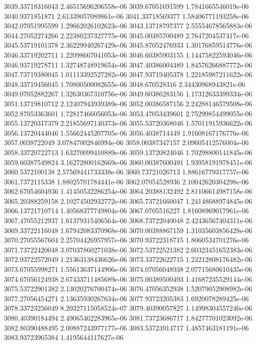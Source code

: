 {3039.33718316043 2.46515696206558e-06
3039.67051691599 1.7841665546019e-06
3040.9371851871 2.61339057089861e-06
3041.33718569377 1.58406771193258e-06
3042.07051995599 1.29662026102623e-06
3043.13718797377 2.55554678565883e-06
3044.27052274266 2.22380237327775e-06
3045.00385700489 2.7647204537417e-06
3045.53719101378 2.36229940267429e-06
3045.87052476933 1.30176859514776e-06
3046.33719202711 1.22098667041053e-06
3046.60385903155 1.14475822593046e-06
3046.93719278711 1.32748748919654e-06
3047.40386004489 1.84576266887772e-06
3047.73719380045 1.01113392527282e-06
3047.93719405378 1.22185987211622e-06
3048.33719456045 1.70800500082655e-06
3048.670528316 2.34430968943821e-06
3049.07052882267 1.32630367310756e-06
3049.60386283156 1.17312633399334e-06
3051.13719810712 2.12407943939389e-06
3052.00386587156 2.24288146579508e-06
3052.87053363601 1.72817466056053e-06
3053.47053439601 2.75299854499055e-06
3055.13720317379 2.21855697140373e-06
3055.53720368046 1.57011915936622e-06
3056.13720444046 1.55662445207705e-06
3056.4038714449 1.91608167176776e-06
3057.0038722049 3.07847002846994e-06
3058.00387347157 2.09605412576004e-06
3058.33720722713 1.63270099410889e-06
3059.13720824046 1.70298800141845e-06
3059.60387549824 3.16272800162669e-06
3060.00387600491 1.93958191978451e-06
3060.5372100138 2.57569441733338e-06
3060.73721026713 1.88616779317757e-06
3061.7372115338 1.88025701784441e-06
3062.07054528936 2.10042620304298e-06
3062.67054604936 1.41450532286254e-06
3064.20388132492 2.81106614987158e-06
3065.20388259158 2.10274502932772e-06
3065.73721660047 1.24148688974845e-06
3066.13721710714 1.40568377749804e-06
3067.0705516227 1.81608969017961e-06
3067.47055212937 1.61379315406564e-06
3068.73722040048 2.42436567404311e-06
3069.33722116048 1.67942083370968e-06
3070.00388867159 1.31035603856428e-06
3070.27055567604 2.25704426957957e-06
3070.93722318715 1.8060534701276e-06
3071.73722420048 3.07037860271038e-06
3072.53722521382 2.60323451652383e-06
3072.93722572049 1.21363138436626e-06
3073.33722622715 1.23212808176482e-06
3073.67055998271 1.55613637144906e-06
3074.07056048938 2.07715680610435e-06
3074.67056124938 2.67433711485689e-06
3075.00389500493 1.41687235529144e-06
3075.53722901382 2.13020276700474e-06
3076.47056352938 1.52079052908982e-06
3077.27056454271 2.13635930267634e-06
3077.93723205383 1.6920078289425e-06
3078.33723256049 8.20327115058524e-07
3079.40390057827 1.14998304557246e-06
3080.40390184494 2.49065462283965e-06
3081.73723686717 1.84277701023092e-06
3082.80390488495 2.00887243977177e-06
3083.53723914717 1.4857463181191e-06
3083.93723965384 1.4195644117627e-06
}
